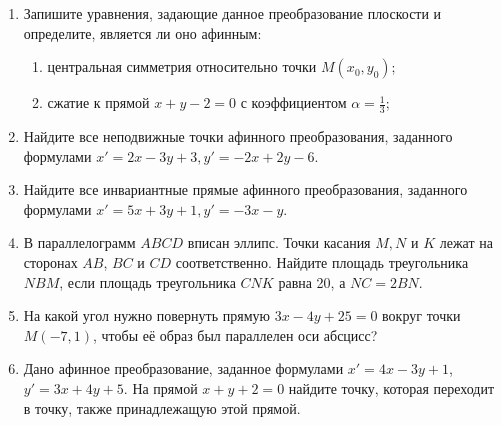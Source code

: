 \begin{enumerate}
    \item Запишите уравнения, задающие данное преобразование плоскости и определите, является ли оно афинным:
        \begin{enumerate}
            \item центральная симметрия относительно точки $M(x_0, y_0)$;
            \item сжатие к прямой $x + y - 2 = 0$ с коэффициентом $\alpha = \frac{1}{3}$;
        \end{enumerate}
   		
   \item  Найдите все неподвижные точки афинного преобразования, заданного формулами ${x' = 2x - 3y +3}, {y' = -2x + 2y - 6}$.
	
	\item Найдите все инвариантные прямые афинного преобразования, заданного формулами ${x' = 5x + 3y +1}, {y' = -3x - y}$.
	
	\item В параллелограмм $ABCD$ вписан эллипс. Точки касания $M, N$ и $K$ лежат на сторонах $AB$, $BC$ и $CD$ соответственно. Найдите площадь треугольника $NBM$, если площадь треугольника $CNK$ равна 20, а $NC = 2BN$.
	
	\item На какой угол нужно повернуть прямую $3x - 4y + 25 = 0$ вокруг точки $M(-7, 1)$, чтобы её образ был параллелен оси абсцисс?
	
	\item Дано афинное преобразование, заданное формулами ${x' = 4x-3y+1}$,  ${y'=3x+4y+5}$. На прямой ${x+y+2=0}$ найдите точку, которая переходит в точку, также принадлежащую этой прямой.
\end{enumerate}